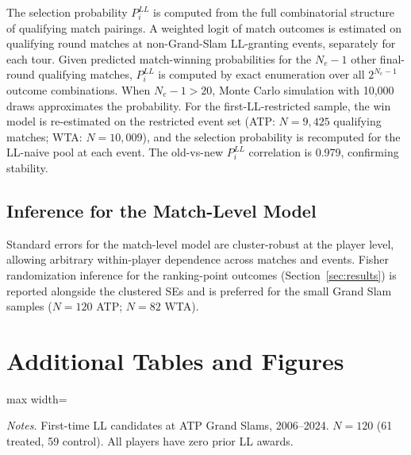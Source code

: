 The selection probability $P_i^{LL}$ is computed from the full combinatorial structure of qualifying match pairings. A weighted logit of match outcomes is estimated on qualifying round matches at non-Grand-Slam LL-granting events, separately for each tour. Given predicted match-winning probabilities for the $N_e - 1$ other final-round qualifying matches, $P_i^{LL}$ is computed by exact enumeration over all $2^{N_e - 1}$ outcome combinations. When $N_e - 1 > 20$, Monte Carlo simulation with 10,000 draws approximates the probability. For the first-LL-restricted sample, the win model is re-estimated on the restricted event set (ATP: $N = 9{,}425$ qualifying matches; WTA: $N = 10{,}009$), and the selection probability is recomputed for the LL-naive pool at each event. The old-vs-new $P_i^{LL}$ correlation is 0.979, confirming stability.

\subsection{Inference for the Match-Level Model}
\label{app:inference}

Standard errors for the match-level model are cluster-robust at the player level, allowing arbitrary within-player dependence across matches and events. Fisher randomization inference for the ranking-point outcomes (Section~\ref{sec:results}) is reported alongside the clustered SEs and is preferred for the small Grand Slam samples ($N = 120$ ATP; $N = 82$ WTA).

\clearpage

\section{Additional Tables and Figures}
\label{app:tables}


\begin{table}[htbp]
\centering
\caption{Summary Statistics: ATP Grand Slam (First-LL)}
\label{tab:sumstats_gs_atp}
\begin{threeparttable}
\small
\begin{adjustbox}{max width=\textwidth}

\end{adjustbox}
\begin{tablenotes}
\footnotesize
\item \textit{Notes.} First-time LL candidates at ATP Grand Slams, 2006--2024. $N = 120$ (61 treated, 59 control). All players have zero prior LL awards.
\end{tablenotes}
\end{threeparttable}
\end{table}

